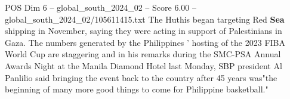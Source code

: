 \begin{textsample}{POS Dim 6 – global\_south\_2024\_02 – Score 6.00 – global\_south\_2024\_02/105611415.txt}
The Huthis began targeting Red \textbf{Sea} shipping in November, saying they were acting in support of Palestinians in Gaza.
The numbers generated by the Philippines ' hosting of the 2023 FIBA World Cup are staggering and in his remarks during the SMC-PSA Annual Awards Night at the Manila Diamond Hotel last Monday, SBP president Al Panlilio said bringing the event back to the country after 45 years was"the beginning of many more good things to come for Philippine basketball."

\end{textsample}
